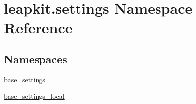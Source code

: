 \hypertarget{namespaceleapkit_1_1settings}{\section{leapkit.\-settings Namespace Reference}
\label{namespaceleapkit_1_1settings}
}
\subsection*{Namespaces}
\begin{DoxyCompactItemize}
\item 
\hyperlink{namespaceleapkit_1_1settings_1_1base__settings}{base\-\_\-settings}
\item 
\hyperlink{namespaceleapkit_1_1settings_1_1base__settings__local}{base\-\_\-settings\-\_\-local}
\end{DoxyCompactItemize}
